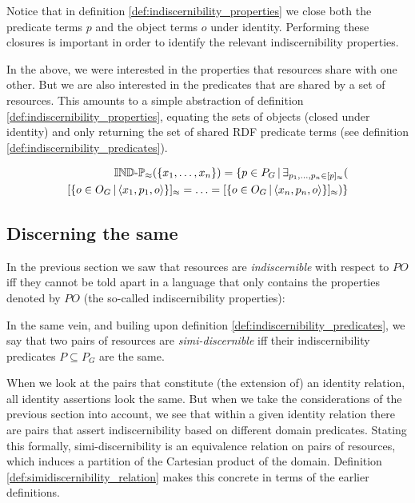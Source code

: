 \noindent Notice that in definition \ref{def:indiscernibility_properties}
  we close both the predicate terms $p$ and the object terms $o$
  under identity.
Performing these closures is important in order to identify
  the relevant indiscernibility properties.

In the above, we were interested in the properties
  that resources share with one other.
But we are also interested in the predicates that are shared by
  a set of resources.
This amounts to a simple abstraction of
  definition \ref{def:indiscernibility_properties},
  equating the sets of objects (closed under identity)
  and only returning the set of shared RDF predicate terms
  (see definition \ref{def:indiscernibility_predicates}).

\small
\begin{definition}
\label{def:indiscernibility_predicates}
\begin{align}
  \indp_{\approx}(\setrange{x_1}{x_n})
=
  \setdef{
    p \in P_G
  }{
    \exists_{\range{p_1}{p_n} \in \equivset{p}}(\nonumber\\
        \equivset{
          \setdef{
            o \in O_G
          }{
            \triple{x_1}{p_1}{o}
          }
        }
      =
        \ldots
      =
        \equivset{
          \setdef{
            o \in O_G
          }{
            \triple{x_n}{p_n}{o}
          }
        }
    )
  }\nonumber
\end{align}
\end{definition}
\normalsize



\subsection{Discerning the same}

In the previous section we saw that resources are \mbox{\emph{indiscernible}}
  with respect to $PO$ iff they cannot be told apart
  in a language that only contains the properties denoted by $PO$
  (the so-called indiscernibility properties):

In the same vein,
  and builing upon definition \ref{def:indiscernibility_predicates},
  we say that two pairs of resources are \emph{simi-discernible}
  iff their \mbox{indiscernibility} predicates $P \subseteq P_G$ are the same.

When we look at the pairs that constitute (the extension of)
  an identity relation, all identity assertions look the same.
But when we take the considerations of the previous section into account,
  we see that within a given identity relation
  there are pairs that assert indiscernibility
  based on different domain predicates.
Stating this formally,
  simi-discernibility is an equivalence relation on pairs of resources,
  which induces a partition of the Cartesian product of the domain.
Definition \ref{def:simidiscernibility_relation} makes this concrete
  in terms of the earlier definitions.

